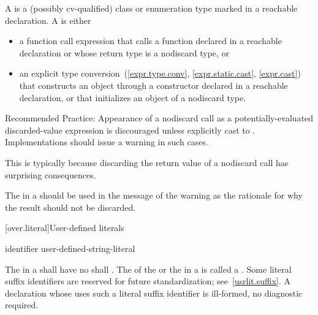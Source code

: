 \documentclass{wg21}
\begin{document}
\pnum
A  is
a (possibly cv-qualified) class or enumeration type
marked  in a reachable declaration.
A  is either
\begin{itemize}
    \item
    a function call expression
    that calls a function declared  in a reachable declaration or
    whose return type is a nodiscard type, or
    \item
    an explicit type
    conversion~(\ref{expr.type.conv}, \ref{expr.static.cast}, \ref{expr.cast})
    that constructs an object through
    a constructor declared  in a reachable declaration, or
    that initializes an object of a nodiscard type.
\end{itemize}

Recommended Practice:
Appearance of a nodiscard call as
a potentially-evaluated discarded-value expression
is discouraged unless explicitly cast to .
Implementations should issue a warning in such cases.
\begin{note}
    This is typically because discarding the return value
    of a nodiscard call has surprising consequences.
\end{note}
The 
in a  
should be used in the message of the warning
as the rationale for why the result should not be discarded.



[over.literal]{User-defined literals}%
%

\begin{bnf}
    \br
      identifier\br
     user-defined-string-literal
\end{bnf}

\pnum
The  
in a  shall have no
 shall .
The  of the  or
the  in a  is called a
.
Some literal suffix identifiers are reserved for future standardization;
see~\ref{usrlit.suffix}.  A declaration whose  uses
such a literal suffix identifier is ill-formed, no diagnostic required.
\end{document}
